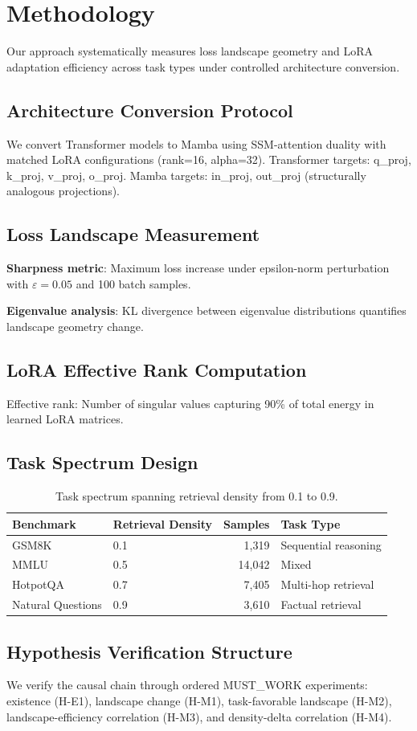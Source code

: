 \section{Methodology}

Our approach systematically measures loss landscape geometry and LoRA adaptation efficiency across task types under controlled architecture conversion.

\subsection{Architecture Conversion Protocol}

We convert Transformer models to Mamba using SSM-attention duality with matched LoRA configurations (rank=16, alpha=32). Transformer targets: q\_proj, k\_proj, v\_proj, o\_proj. Mamba targets: in\_proj, out\_proj (structurally analogous projections).

\subsection{Loss Landscape Measurement}

\textbf{Sharpness metric}: Maximum loss increase under epsilon-norm perturbation with $\varepsilon=0.05$ and 100 batch samples.

\textbf{Eigenvalue analysis}: KL divergence between eigenvalue distributions quantifies landscape geometry change.

\subsection{LoRA Effective Rank Computation}

Effective rank: Number of singular values capturing 90\% of total energy in learned LoRA matrices.

\subsection{Task Spectrum Design}

\begin{table}[h]
\centering
\begin{tabular}{@{}llrl@{}}
\toprule
Benchmark & Retrieval Density & Samples & Task Type \\
\midrule
GSM8K & 0.1 & 1,319 & Sequential reasoning \\
MMLU & 0.5 & 14,042 & Mixed \\
HotpotQA & 0.7 & 7,405 & Multi-hop retrieval \\
Natural Questions & 0.9 & 3,610 & Factual retrieval \\
\bottomrule
\end{tabular}
\caption{Task spectrum spanning retrieval density from 0.1 to 0.9.}
\label{tab:tasks}
\end{table}

\subsection{Hypothesis Verification Structure}

We verify the causal chain through ordered MUST\_WORK experiments: existence (H-E1), landscape change (H-M1), task-favorable landscape (H-M2), landscape-efficiency correlation (H-M3), and density-delta correlation (H-M4).
